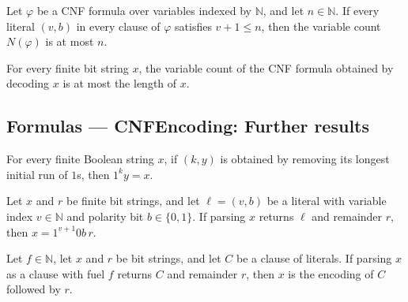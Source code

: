 \begin{theorem}
\label{Std.Sat.CNF.numVars_le_of_literal_bounds}
\leanok
{}
Let $\varphi$ be a CNF formula over variables indexed by $\mathbb{N}$, and let
$n\in\mathbb{N}$. If every literal $(v,b)$ in every clause of $\varphi$ satisfies
$v+1\le n$, then the variable count $N(\varphi)$ is at most $n$.
\end{theorem}

\begin{theorem}
\label{Std.Sat.CNF.numVars_decode_le}
\leanok
{}
For every finite bit string $x$, the variable count of the CNF formula obtained by
decoding $x$ is at most the length of $x$.
\end{theorem}

\subsection*{Formulas --- CNFEncoding: Further results}

\begin{theorem}
\label{Std.Sat.CNF.takeTrues_repr}
\leanok
{}
For every finite Boolean string $x$, if $(k,y)$ is obtained by removing its longest
initial run of $1$s, then $1^k y=x$.
\end{theorem}

\begin{theorem}
\label{Std.Sat.CNF.parseLit_repr}
\leanok
{}
Let $x$ and $r$ be finite bit strings, and let $\ell=(v,b)$ be a literal with variable
index $v\in\mathbb N$ and polarity bit $b\in\{0,1\}$. If parsing $x$ returns $\ell$ and
remainder $r$, then $x=1^{v+1}0b\,r$.
\end{theorem}

\begin{theorem}
\label{Std.Sat.CNF.parseClause_repr}
\leanok
{}
Let $f\in\mathbb{N}$, let $x$ and $r$ be bit strings, and let $C$ be a clause of
literals. If parsing $x$ as a clause with fuel $f$ returns $C$ and remainder $r$, then
$x$ is the encoding of $C$ followed by $r$.
\end{theorem}

